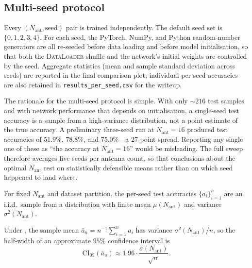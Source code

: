 \documentclass[letterpaper,11pt,leqno]{article}
\begin{document}
\subsection{Multi-seed protocol}

Every $(N_{\mathrm{ant}}, \mathrm{seed})$ pair is trained independently. The default seed set is $\{0, 1, 2, 3, 4\}$. For each seed, the PyTorch, NumPy, and Python random-number generators are all re-seeded before data loading and before model initialisation, so that both the \textsc{DataLoader} shuffle and the network's initial weights are controlled by the seed. Aggregate statistics (mean and sample standard deviation across seeds) are reported in the final comparison plot; individual per-seed accuracies are also retained in \texttt{results\_per\_seed.csv} for the writeup.

The rationale for the multi-seed protocol is simple. With only $\sim 216$ test samples and with network performance that depends on initialisation, a single-seed test accuracy is a sample from a high-variance distribution, not a point estimate of the true accuracy. A preliminary three-seed run at $N_{\mathrm{ant}}=16$ produced test accuracies of $51.9\%$, $78.8\%$, and $75.0\%$---a 27-point spread. Reporting any single one of these as ``the accuracy at $N_{\mathrm{ant}}=16$'' would be misleading. The full sweep therefore averages five seeds per antenna count, so that conclusions about the optimal $N_{\mathrm{ant}}$ rest on statistically defensible means rather than on which seed happened to land where.

\begin{assumption}\label{a:iid_seeds}
For fixed $N_{\mathrm{ant}}$ and dataset partition, the per-seed test accuracies $\{a_i\}_{i=1}^{n}$ are an i.i.d.\ sample from a distribution with finite mean $\mu(N_{\mathrm{ant}})$ and variance $\sigma^2(N_{\mathrm{ant}})$.
\end{assumption}

\begin{lemma}\label{l:sem}
Under , the sample mean $\bar a_n = n^{-1}\sum_{i=1}^n a_i$ has variance $\sigma^2(N_{\mathrm{ant}})/n$, so the half-width of an approximate $95\%$ confidence interval is
\begin{equation}\label{e:ci}
\mathrm{CI}_{95}(\bar a_n) \approx 1.96\cdot \frac{\sigma(N_{\mathrm{ant}})}{\sqrt{n}}.
\end{equation}
\end{lemma}
\end{document}
